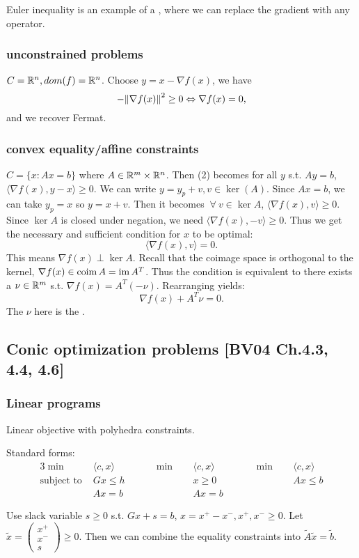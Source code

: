 \documentclass[class=article,crop=false]{standalone}
\begin{document}
\begin{remark}
Euler inequality is an example of a , where we can replace the gradient with any operator.
\end{remark}

\subsubsection{unconstrained problems}
	$ C= \mathbb{R}^{n}, dom(f) = \mathbb{R}^{n}$. Choose $ y = x- \nabla f(x)$, we have
	\[
		-{\left\lVert{ \nabla f(x)}\right\rVert} ^2 \geq 0 \Leftrightarrow \nabla f(x) = 0
	,\]
	and we recover Fermat.

\subsubsection{convex equality/affine constraints}
	$ C = \{x: Ax=b\}$ where $ A \in \mathbb{R}^{m} \times \mathbb{R}^{n}$. Then (2) becomes for all $ y$  s.t. $ Ay=b$,  $ \langle \nabla f(x),y-x \rangle\geq 0$. We can write $ y= y_p +v, v \in \ker(A)$. Since $ Ax = b$, we can take $ y_p = x$ so $ y=x+v$. Then it becomes $ \ \forall \ v \in \ker A$, $ \langle \nabla f(x),v  \rangle \geq 0$. Since $ \ker A$ is closed under negation, we need $ \langle \nabla f(x),-v \rangle\geq 0$. Thus we get the necessary and sufficient condition for $ x$ to be optimal:
	\[
		\langle \nabla f(x),v \rangle = 0
	.\]
	This means $ \nabla f(x) \perp \ker A$. Recall that the coimage space is orthogonal to the kernel, $ \nabla f(x) \in \operatorname{coim} A = \operatorname{im} A^{T}$. Thus the condition is equivalent to there exists a $ \nu \in \mathbb{R}^{m}$ s.t. $ \nabla f(x) = A^{T} (-\nu)$. Rearranging yields: 
	\[
		\nabla f(x) + A^{T}\nu = 0
	.\] 
The $ \nu$ here is the . 
\subsection{Conic optimization problems [BV04 Ch.4.3, 4.4, 4.6]}

\subsubsection{Linear programs}
Linear objective with polyhedra constraints.

Standard forms:
\begin{alignat*}{3}
	\min\ & \langle c,x \rangle \qquad\qquad  \min\ &&\langle c,x \rangle \qquad\qquad \min\ &&\langle c,x \rangle\\
	\text{subject to } &Gx \leq h &&x\geq 0 \qquad  &&Ax\leq b\\
			   &Ax = b &&Ax=b &&
\end{alignat*}	
\begin{eg}
Use slack variable $ s\geq 0$  s.t. $ Gx+s =b$, $ x=x^{+}-x^{-}, x^{+},x^{-}\geq 0$. Let $ \widetilde{ x} = \begin{pmatrix} x^{+}\\x^{-}\\s \end{pmatrix} \geq 0$. Then we can combine the equality constraints into $ \widetilde{ A}\widetilde{ x}  = \widetilde{ b}$.
\end{eg}
\end{document}
